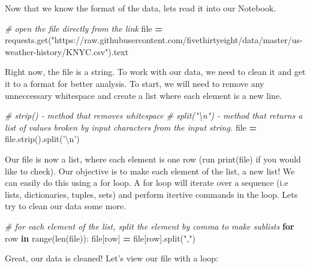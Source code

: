 \documentclass[]{book}
\newenvironment{Shaded}{\begin{snugshade}}{\end{snugshade}}
\newcommand{\KeywordTok}[1]{\textcolor[rgb]{0.13,0.29,0.53}{\textbf{#1}}}
\newcommand{\CharTok}[1]{\textcolor[rgb]{0.31,0.60,0.02}{#1}}
\newcommand{\StringTok}[1]{\textcolor[rgb]{0.31,0.60,0.02}{#1}}
\newcommand{\CommentTok}[1]{\textcolor[rgb]{0.56,0.35,0.01}{\textit{#1}}}
\newcommand{\ControlFlowTok}[1]{\textcolor[rgb]{0.13,0.29,0.53}{\textbf{#1}}}
\newcommand{\OperatorTok}[1]{\textcolor[rgb]{0.81,0.36,0.00}{\textbf{#1}}}
\newcommand{\BuiltInTok}[1]{#1}
\newcommand{\NormalTok}[1]{#1}
\begin{document}
Now that we know the format of the data, lets read it into our Notebook.

\begin{Shaded}
\begin{Highlighting}[]
\CommentTok{# open the file directly from the link}
\BuiltInTok{file} \OperatorTok{=}\NormalTok{ requests.get(}\StringTok{"https://raw.githubusercontent.com/fivethirtyeight/data/master/us-weather-history/KNYC.csv"}\NormalTok{).text}
\end{Highlighting}
\end{Shaded}

Right now, the file is a string. To work with our data, we need to clean
it and get it to a format for better analysis. To start, we will need to
remove any unneccessary whitespace and create a list where each element
is a new line.

\begin{Shaded}
\begin{Highlighting}[]
\CommentTok{# strip() - method that removes whitespace }
\CommentTok{# split("\textbackslash{}n") - method that returns a list of values broken by input characters from the input string.}
\BuiltInTok{file} \OperatorTok{=} \BuiltInTok{file}\NormalTok{.strip().split(}\StringTok{'}\CharTok{\textbackslash{}n}\StringTok{'}\NormalTok{)}
\end{Highlighting}
\end{Shaded}

Our file is now a list, where each element is one row (run print(file)
if you would like to check). Our objective is to make each element of
the list, a new list! We can easily do this using a for loop. A for loop
will iterate over a sequence (i.e lists, dictionaries, tuples, sets) and
perform itertive commands in the loop. Lets try to clean our data some
more.

\begin{Shaded}
\begin{Highlighting}[]
\CommentTok{# for each element of the list, split the element by comma to make sublists}
\ControlFlowTok{for}\NormalTok{ row }\KeywordTok{in} \BuiltInTok{range}\NormalTok{(}\BuiltInTok{len}\NormalTok{(}\BuiltInTok{file}\NormalTok{)):}
    \BuiltInTok{file}\NormalTok{[row] }\OperatorTok{=} \BuiltInTok{file}\NormalTok{[row].split(}\StringTok{","}\NormalTok{)}
\end{Highlighting}
\end{Shaded}

Great, our data is cleaned! Let's view our file with a loop:
\end{document}
